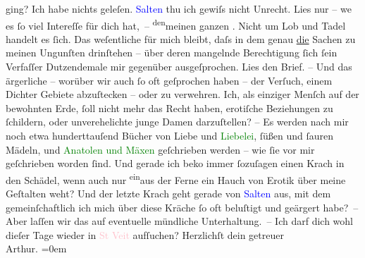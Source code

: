                ging? Ich habe nichts geleſen.\pend
           \pstart
           \textcolor{blue}{Salten}{}\ledrightnote{\textcolor{blue}{Felix Salten}} thu ich gewiſs nicht Unrecht. {\pb}Lies nur – we{\geminationn} es ſo viel Intereſſe für dich hat, – \substVorne{}\textsuperscript{den}\substDazwischen{}meinen\substHinten{} ganzen \label{K_L01338_2v}\label{K_L01338_2h}. Nicht um
               Lob und Tadel handelt es ſich. Das weſentliche für mich bleibt, daſs in dem \label{K_L01338_3v}\label{K_L01338_3h} genau \uline{die}{ }Sachen \introOben{}zu meinen Ungunſten\introOben{}
               drinſtehen – über deren mangelnde Berechtigung ſich ſein Verfaſſer Dutzendemale mir
               gegenüber ausgeſprochen. Lies den Brief. – Und das ärgerliche – worüber wir auch ſo
               oft geſprochen haben – der Verſuch, einem Dichter Gebiete abzuſtecken – oder zu
               verwehren. Ich, als einziger Menſch auf der bewohnten Erde, ſoll nicht mehr {\pb}das Recht haben,
               erotiſche Beziehungen zu ſchildern, oder unverehelichte junge Damen darzuſtellen? –
               Es werden nach mir noch etwa hunderttauſend Bücher von Liebe und \textcolor{green}{Liebelei}{}, ſüßen und ſauren Mädeln, und \textcolor{green}{Anatolen und Mäxen}{} geſchrieben
               werden – wie ſie vor mir geſchrieben worden ſind. Und gerade ich beko{\geminationm} immer ſozuſagen einen Krach in den Schädel, wenn auch
               nur \substVorne{}\textsuperscript{ein}\substDazwischen{}aus\substHinten{} der Ferne ein Hauch von Erotik über meine Geſtalten weht? {\pb}Und der letzte Krach
               geht gerade von \textcolor{blue}{Salten}{}\ledrightnote{\textcolor{blue}{Felix Salten}} aus, mit dem
               gemeinſchaftlich ich mich über diese Kräche \introOben{}ſo oft\introOben{} beluſtigt
               und geärgert habe? – Aber laſſen wir das auf eventuelle mündliche Unterhaltung. – Ich
               darf dich wohl dieſer Tage wieder in \textcolor{pink}{St Veit}{}\ledrightnote{\textcolor{pink}{Ober Sankt Veit}}
               aufſuchen?\pend
           \pstart
           Herzlichſt dein getreuer{\\[\baselineskip]}\spacefill\mbox{Arthur.}\pend
           \leftskip=0em{}\endnumbering{}  
      